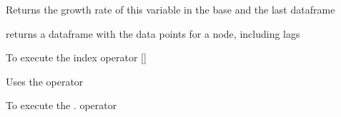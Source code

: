 \documentclass[letterpaper,10pt,english]{sphinxmanual}
\begin{document}
\begin{fulllineitems}
\begin{fulllineitems}
\label{\detokenize{core/modelclass:modelclass.Org_model_Mixin.get_var_growth}}
\pysigstartsignatures
{}
\pysigstopsignatures
\sphinxAtStartPar
Returns the  growth rate of this variable in the base and the last dataframe

\end{fulllineitems}


\begin{fulllineitems}
\label{\detokenize{core/modelclass:modelclass.Org_model_Mixin.get_values}}
\pysigstartsignatures
{}
\pysigstopsignatures
\sphinxAtStartPar
returns a dataframe with the data points for a node,  including lags

\end{fulllineitems}


\begin{fulllineitems}
\label{\detokenize{core/modelclass:modelclass.Org_model_Mixin.__getitem__}}
\pysigstartsignatures
{}
\pysigstopsignatures
\sphinxAtStartPar
To execute the index operator {[}{]}

\sphinxAtStartPar
Uses the {\hyperref[\detokenize{vis/modelvis:modelvis.vis}]{}} operator

\end{fulllineitems}


\begin{fulllineitems}
\label{\detokenize{core/modelclass:modelclass.Org_model_Mixin.__getattr__}}
\pysigstartsignatures
{}
\pysigstopsignatures
\sphinxAtStartPar
To execute the . operator


\end{fulllineitems}
\end{fulllineitems}
\end{document}
